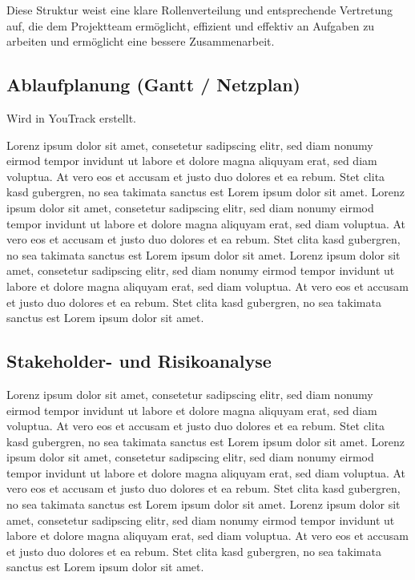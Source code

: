 Diese Struktur weist eine klare Rollenverteilung und entsprechende Vertretung auf, die dem Projektteam ermöglicht, effizient und effektiv an Aufgaben zu arbeiten und ermöglicht eine bessere Zusammenarbeit.



\subsection{Ablaufplanung (Gantt / Netzplan)}\label{subsec:Ablaufplan}
Wird in YouTrack erstellt.

Lorenz ipsum dolor sit amet, consetetur sadipscing elitr, sed diam nonumy eirmod tempor invidunt ut labore et dolore magna aliquyam erat, sed diam voluptua.
At vero eos et accusam et justo duo dolores et ea rebum.
Stet clita kasd gubergren, no sea takimata sanctus est Lorem ipsum dolor sit amet.
Lorenz ipsum dolor sit amet, consetetur sadipscing elitr, sed diam nonumy eirmod tempor invidunt ut labore et dolore magna aliquyam erat, sed diam voluptua.
At vero eos et accusam et justo duo dolores et ea rebum.
Stet clita kasd gubergren, no sea takimata sanctus est Lorem ipsum dolor sit amet.
Lorenz ipsum dolor sit amet, consetetur sadipscing elitr, sed diam nonumy eirmod tempor invidunt ut labore et dolore magna aliquyam erat, sed diam voluptua.
At vero eos et accusam et justo duo dolores et ea rebum.
Stet clita kasd gubergren, no sea takimata sanctus est Lorem ipsum dolor sit amet.

\subsection{Stakeholder- und Risikoanalyse}\label{subsec:Stakeholder-Risikoanalyse}
Lorenz ipsum dolor sit amet, consetetur sadipscing elitr, sed diam nonumy eirmod tempor invidunt ut labore et dolore magna aliquyam erat, sed diam voluptua.
At vero eos et accusam et justo duo dolores et ea rebum.
Stet clita kasd gubergren, no sea takimata sanctus est Lorem ipsum dolor sit amet.
Lorenz ipsum dolor sit amet, consetetur sadipscing elitr, sed diam nonumy eirmod tempor invidunt ut labore et dolore magna aliquyam erat, sed diam voluptua.
At vero eos et accusam et justo duo dolores et ea rebum.
Stet clita kasd gubergren, no sea takimata sanctus est Lorem ipsum dolor sit amet.
Lorenz ipsum dolor sit amet, consetetur sadipscing elitr, sed diam nonumy eirmod tempor invidunt ut labore et dolore magna aliquyam erat, sed diam voluptua.
At vero eos et accusam et justo duo dolores et ea rebum.
Stet clita kasd gubergren, no sea takimata sanctus est Lorem ipsum dolor sit amet.

